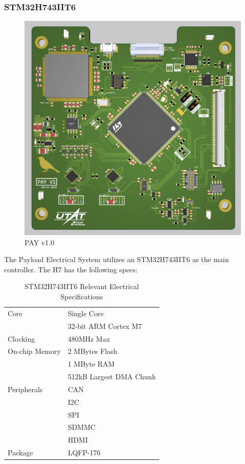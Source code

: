 \documentclass[12pt,a4paper]{article}
\begin{document}
    \subsubsection{STM32H743IIT6}
    \begin{figure}[H]
        \centering
        \includegraphics[width=0.5\linewidth]{../figures/PAY_SS.png}
        \caption{PAY v1.0}
    \end{figure}

    The Payload Electrical System utilizes an STM32H743IIT6 as the main 
    controller. The H7 has the following specs:

    \begin{table}[H]\centering
        \begin{tabular}{l | l}
            Core & Single Core \\
            & 32-bit ARM Cortex M7 \\ \hline
            Clocking & 480MHz Max \\ \hline
            On-chip Memory & 2 MBytes Flash \\
            & 1 MByte RAM \\ 
            & 512kB Largest DMA Chunk \\ \hline
            Peripherals & CAN \\
            & I2C \\
            & SPI \\
            & SDMMC \\
            & HDMI \\ \hline
            Package & LQFP-176\\ 
        \end{tabular}
        \caption{STM32H743IIT6 Relevant Electrical Specifications}
    \end{table}
\end{document}
